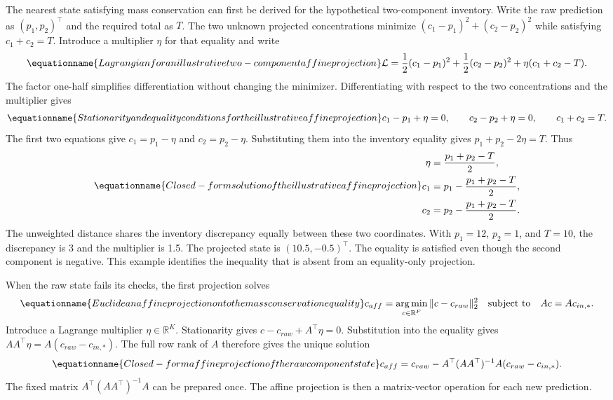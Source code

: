 The nearest state satisfying mass conservation can first be derived for the hypothetical two-component inventory. Write the raw prediction as \((p_1,p_2)^\top\) and the required total as \(T\). The two unknown projected concentrations minimize \((c_1-p_1)^2+(c_2-p_2)^2\) while satisfying \(c_1+c_2=T\). Introduce a multiplier \(\eta\) for that equality and write
\begin{equation}
\equationname{Lagrangian for an illustrative two-component affine projection}
\label{eq:icsor_scalar_projection_lagrangian}
\mathcal{L}=\frac{1}{2}(c_1-p_1)^2+
\frac{1}{2}(c_2-p_2)^2+\eta(c_1+c_2-T).
\end{equation}
The factor one-half simplifies differentiation without changing the minimizer. Differentiating with respect to the two concentrations and the multiplier gives
\begin{equation}
\equationname{Stationarity and equality conditions for the illustrative affine projection}
\label{eq:icsor_scalar_projection_conditions}
c_1-p_1+\eta=0,
\qquad c_2-p_2+\eta=0,
\qquad c_1+c_2=T.
\end{equation}
The first two equations give \(c_1=p_1-\eta\) and \(c_2=p_2-\eta\). Substituting them into the inventory equality gives \(p_1+p_2-2\eta=T\). Thus
\begin{equation}
\equationname{Closed-form solution of the illustrative affine projection}
\label{eq:icsor_scalar_projection_solution}
\begin{aligned}
\eta&=\frac{p_1+p_2-T}{2},\\
c_1&=p_1-\frac{p_1+p_2-T}{2},\\
c_2&=p_2-\frac{p_1+p_2-T}{2}.
\end{aligned}
\end{equation}
The unweighted distance shares the inventory discrepancy equally between these two coordinates. With \(p_1=12\), \(p_2=1\), and \(T=10\), the discrepancy is 3 and the multiplier is 1.5. The projected state is \((10.5,-0.5)^\top\). The equality is satisfied even though the second component is negative. This example identifies the inequality that is absent from an equality-only projection.

When the raw state fails its checks, the first projection solves
\begin{equation}
\equationname{Euclidean affine projection onto the mass conservation equality}
\label{eq:icsor_affine_problem}
c_{aff}=\mathop{\arg\min}_{c\in\mathbb{R}^{F}}\|c-c_{raw}\|_2^2
\quad\text{subject to}\quad Ac=Ac_{in,*}.
\end{equation}
Introduce a Lagrange multiplier \(\eta\in\mathbb{R}^{K}\). Stationarity gives \(c-c_{raw}+A^\top\eta=0\). Substitution into the equality gives \(AA^\top\eta=A(c_{raw}-c_{in,*})\). The full row rank of \(A\) therefore gives the unique solution
\begin{equation}
\equationname{Closed-form affine projection of the raw component state}
\label{eq:icsor_affine_solution}
c_{aff}=c_{raw}-A^\top(AA^\top)^{-1}A(c_{raw}-c_{in,*}).
\end{equation}
The fixed matrix \(A^\top(AA^\top)^{-1}A\) can be prepared once. The affine projection is then a matrix-vector operation for each new prediction.

